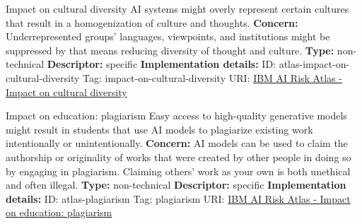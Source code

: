 \documentclass[a4paper,12pt]{article}
\begin{document}
\begin{definitionbox}{Impact on cultural diversity}
AI systems might overly represent certain cultures that result in a homogenization of culture and thoughts.\newline\newline
\textbf{Concern: }Underrepresented groups' languages, viewpoints, and institutions might be suppressed by that means reducing diversity of thought and culture.\newline\newline
\textbf{Type: }non-technical\newline
\textbf{Descriptor: }specific \newline\newline
\textbf{Implementation details: } \newline
ID: atlas-impact-on-cultural-diversity \newline
Tag: impact-on-cultural-diversity \newline
URI:  \href{https://www.ibm.com/docs/en/watsonx/saas?topic=SSYOK8/wsj/ai-risk-atlas/impact-on-cultural-diversity.html}{IBM AI Risk Atlas - Impact on cultural diversity}\newline
\end{definitionbox}
\begin{definitionbox}{Impact on education: plagiarism}
Easy access to high-quality generative models might result in students that use AI models to plagiarize existing work intentionally or unintentionally.\newline\newline
\textbf{Concern: }AI models can be used to claim the authorship or originality of works that were created by other people in doing so by engaging in plagiarism. Claiming others' work as your own is both unethical and often illegal.\newline\newline
\textbf{Type: }non-technical\newline
\textbf{Descriptor: }specific \newline\newline
\textbf{Implementation details: } \newline
ID: atlas-plagiarism \newline
Tag: plagiarism \newline
URI:  \href{https://www.ibm.com/docs/en/watsonx/saas?topic=SSYOK8/wsj/ai-risk-atlas/plagiarism.html}{IBM AI Risk Atlas - Impact on education: plagiarism}\newline
\end{definitionbox}
\end{document}

